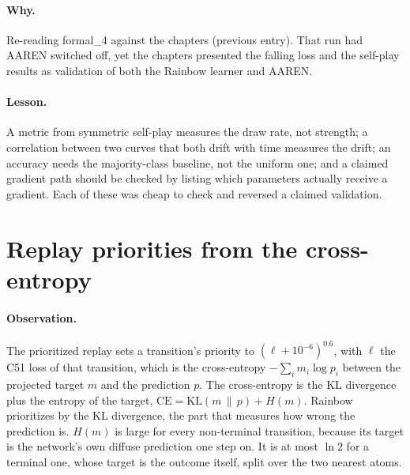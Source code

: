 \paragraph{Why.} Re-reading formal\_4 against the chapters (previous entry). That run had AAREN
switched off, yet the chapters presented the falling loss and the self-play results as validation
of both the Rainbow learner and AAREN.

\paragraph{Lesson.} A metric from symmetric self-play measures the draw rate, not strength; a
correlation between two curves that both drift with time measures the drift; an accuracy needs
the majority-class baseline, not the uniform one; and a claimed gradient path should be checked
by listing which parameters actually receive a gradient. Each of these was cheap to check and
reversed a claimed validation.

\section{Replay priorities from the cross-entropy}

\paragraph{Observation.} The prioritized replay \cite{RainbowJMLR2021} sets a transition's priority to
$(\ell + 10^{-6})^{0.6}$, with $\ell$ the C51 loss of that transition, which is the cross-entropy
$-\sum_i m_i \log p_i$ between the projected target $m$ and the prediction $p$. The
cross-entropy is the KL divergence plus the entropy of the target,
$\mathrm{CE} = \mathrm{KL}(m \,\|\, p) + H(m)$. Rainbow prioritizes by the KL divergence, the part
that measures how wrong the prediction is. $H(m)$ is large for every non-terminal transition,
because its target is the network's own diffuse prediction one step on. It is at most $\ln 2$ for a
terminal one, whose target is the outcome itself, split over the two nearest atoms.

